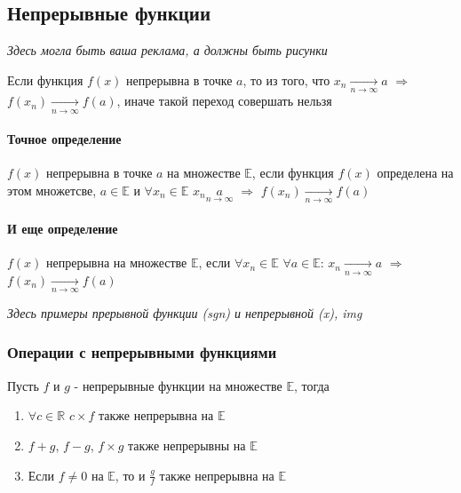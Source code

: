\documentclass[class=article,a4paper,12pt,crop=false]{standalone}
\begin{document}
\subsection{Непрерывные функции}

\textit{Здесь могла быть ваша реклама, а должны быть рисунки}

Если функция $f(x)$ непрерывна в точке $a$, то из того, что $x_n \underset{n \rightarrow \infty}{\rightarrow} a$
$\Rightarrow$ $f(x_n) \underset{n \rightarrow \infty}{\rightarrow} f(a)$, иначе такой переход совершать нельзя

\paragraph{Точное определение} $f(x)$ непрерывна в точке $a$ на множестве $\mathbb{E}$, если функция $f(x)$
определена на этом множетсве, $a \in \mathbb{E}$ и $\forall x_n \in \mathbb{E}$
$x_n \underset{n \rightarrow \infty}{a}$ $\Rightarrow$ $f(x_n) \underset{n \rightarrow \infty}{\rightarrow} f(a)$

\paragraph{И еще определение} $f(x)$ непрерывна на множестве $\mathbb{E}$, если 
$\forall x_n \in \mathbb{E}$ $\forall a \in \mathbb{E}$: $x_n \underset{n \rightarrow \infty}{\rightarrow} a$
$\Rightarrow$ $f(x_n) \underset{n \rightarrow \infty}{\rightarrow} f(a)$

\textit{Здесь примеры прерывной функции (sgn) и непрерывной (x), img}

\subsubsection{Операции с непрерывными функциями}

Пусть $f$ и $g$ - непрерывные функции на множестве $\mathbb{E}$, тогда

\begin{enumerate}
    \item {
        $\forall c \in \mathbb{R}$ $c \times f$ также непрерывна на $\mathbb{E}$
    }
    \item {
        $f + g$, $f - g$, $f \times g$ также непрерывны на $\mathbb{E}$
    }
    \item {
        Если $f \neq 0$ на $\mathbb{E}$, то и $\frac{g}{f}$ также непрерывна на $\mathbb{E}$
    }
\end{enumerate}
\end{document}
